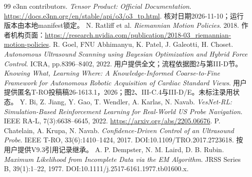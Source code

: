 \documentclass[UTF8,fontset=fandol,11pt,a4paper]{ctexart}
\theoremstyle{plain}
\theoremstyle{definition}
\theoremstyle{remark}
\numberwithin{equation}{section}
\begin{document}
\begin{thebibliography}{99}
 e3nn contributors. \emph{Tensor Product: Official Documentation}. \url{https://docs.e3nn.org/en/stable/api/o3/o3_tp.html}. 核对日期2026-11-10；运行版本由本地manifest锁定。
 N. Ratliff et al. \emph{Riemannian Motion Policies}. 2018. 作者机构页面：\url{https://research.nvidia.com/publication/2018-03_riemannian-motion-policies}.
 R. Goel, FNU Abhimanyu, K. Patel, J. Galeotti, H. Choset. \emph{Autonomous Ultrasound Scanning using Bayesian Optimization and Hybrid Force Control}. ICRA, pp.8396--8402, 2022. 用户提供全文；流程依据图2与第III-D节。
 \emph{Knowing What, Learning Where: A Knowledge-Informed Coarse-to-Fine Framework for Autonomous Robotic Acquisition of Cardiac Standard Views}. 用户提供匿名T-RO投稿稿26-1613.1，2026；图2、III-C.4与III-D/E。未标注录用状态。
 Y. Bi, Z. Jiang, Y. Gao, T. Wendler, A. Karlas, N. Navab. \emph{VesNet-RL: Simulation-Based Reinforcement Learning for Real-World US Probe Navigation}. IEEE RA-L, 7(3):6638--6645, 2022. \url{https://arxiv.org/abs/2205.06676}.
 P. Chatelain, A. Krupa, N. Navab. \emph{Confidence-Driven Control of an Ultrasound Probe}. IEEE T-RO, 33(6):1410--1424, 2017. DOI:10.1109/TRO.2017.2723618. 按用户提供V9.3引用记录继承。
 A. P. Dempster, N. M. Laird, D. B. Rubin. \emph{Maximum Likelihood from Incomplete Data via the EM Algorithm}. JRSS Series B, 39(1):1--22, 1977. DOI:10.1111/j.2517-6161.1977.tb01600.x.
\end{thebibliography}
\end{document}
